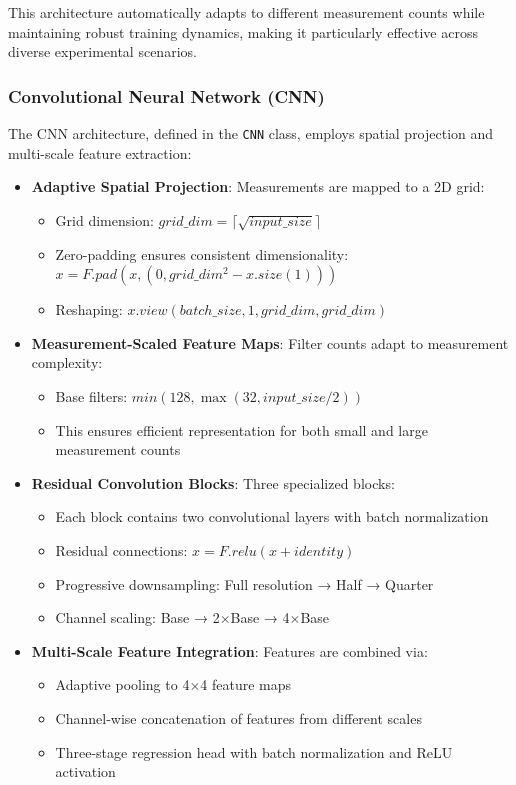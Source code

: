 \documentclass{optica-article}
\begin{document}
This architecture automatically adapts to different measurement counts while maintaining robust training dynamics, making it particularly effective across diverse experimental scenarios.

\subsubsection{Convolutional Neural Network (CNN)}

The CNN architecture, defined in the \texttt{CNN} class, employs spatial projection and multi-scale feature extraction:

\begin{itemize}
\item \textbf{Adaptive Spatial Projection}: Measurements are mapped to a 2D grid:
\begin{itemize}
\item Grid dimension: $grid\_dim = \lceil\sqrt{input\_size}\rceil$
\item Zero-padding ensures consistent dimensionality: \\ $x = F.pad(x, (0, grid\_dim^2 - x.size(1)))$
\item Reshaping: $x.view(batch\_size, 1, grid\_dim, grid\_dim)$
\end{itemize}

\item \textbf{Measurement-Scaled Feature Maps}: Filter counts adapt to measurement complexity:
\begin{itemize}
\item Base filters: $min(128, \max(32, input\_size / 2))$
\item This ensures efficient representation for both small and large measurement counts
\end{itemize}

\item \textbf{Residual Convolution Blocks}: Three specialized blocks:
\begin{itemize}
\item Each block contains two convolutional layers with batch normalization
\item Residual connections: $x = F.relu(x + identity)$
\item Progressive downsampling: Full resolution → Half → Quarter
\item Channel scaling: Base → 2$\times$Base → 4$\times$Base
\end{itemize}

\item \textbf{Multi-Scale Feature Integration}: Features are combined via:
\begin{itemize}
\item Adaptive pooling to 4$\times$4 feature maps
\item Channel-wise concatenation of features from different scales
\item Three-stage regression head with batch normalization and ReLU activation
\end{itemize}
\end{itemize}
\end{document}
